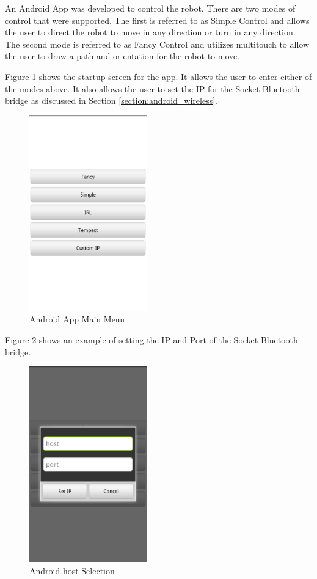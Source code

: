 An Android App was developed to control the robot.  There are two modes of control that were supported.  The first is referred to as Simple Control and allows the user to direct the robot to move in any direction or turn in any direction.  The second mode is referred to as Fancy Control and utilizes multitouch to allow the user to draw a path and orientation for the robot to move.

Figure \ref{figure:menu} shows the startup screen for the app.  It allows the user to enter either of the modes above.  It also allows the user to set the IP for the Socket-Bluetooth bridge as discussed in Section \ref{section:android_wireless}.

\begin{figure}[H]
    \begin{center}
        \includegraphics[width=2in]{images/menu.png}
    \end{center}
    \caption{Android App Main Menu}
    \label{figure:menu}
\end{figure}

Figure \ref{figure:host_control} shows an example of setting the IP and Port of the Socket-Bluetooth bridge.

\begin{figure}[H]
    \begin{center}
        \includegraphics[width=2in]{images/host_control.png}
    \end{center}
    \caption{Android host Selection}
    \label{figure:host_control}
\end{figure}

